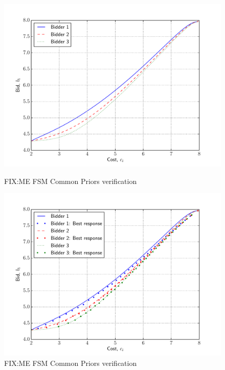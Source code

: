 \begin{figure}[p!]
  \includegraphics[width=\figsize]{Approximation/Figures/fsm_common_priors_verification}
  \caption{FIX:ME FSM Common Priors verification}
  \label{fig:fsm_common_priors_verification_approximation}
  \vspace{10mm}
  \includegraphics[width=\figsize]{Approximation/Figures/fsm_common_priors_verification_sufficiency}
  \caption{FIX:ME FSM Common Priors verification}
  \label{fig:fsm_common_priors_verification_sufficiency_approximation}
\end{figure}



